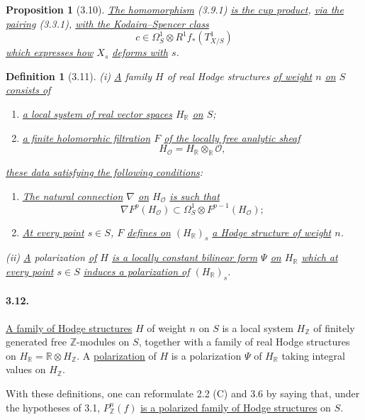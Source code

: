 \documentclass[10pt,leqno]{article}
\newcommand{\R}{\mathbb R}
\newcommand{\Z}{\mathbb Z}
\newcommand{\cO}{\mathcal O}
\theoremstyle{deligne}
\newtheorem*{definition}{Definition}
\newtheorem*{proposition}{Proposition}\newtheorem*{corollary}{Corollary}\newtheorem*{monodromyTheorem}{Monodromy Theorem}
\renewcommand{\underline}[1]{\uline{#1}}
\begin{document}
\begin{proposition}[3.10]\leavevmode\par\noindent
\underline{The homomorphism} (3.9.1) \underline{is the cup product}, \underline{via the pairing} (3.3.1), \underline{with the Kodaira--Spencer class}
\[
c\in\Omega_S^1\otimes R^1f_*(T^1_{X/S})
\]
\underline{which expresses how} $X_s$ \underline{deforms with} $s$.
\end{proposition}

\begin{definition}[3.11]
(i) \underline{A} family $H$ of real Hodge structures \underline{of weight} $n$ \underline{on} $S$ \underline{consists of}
\begin{enumerate}[label=\alph*)]
\item \underline{a local system of real vector spaces} $H_\R$ \underline{on} $S$;
\item \underline{a finite holomorphic filtration} $F$ \underline{of the locally free analytic sheaf}
\[
H_\cO=H_\R\otimes_\R\cO,
\]
\end{enumerate}
\underline{these data satisfying the following conditions}:
\begin{enumerate}[label=(H.\arabic*)]
\item \underline{The natural connection} $\nabla$ \underline{on} $H_\cO$ \underline{is such that}
\[
\nabla F^p(H_\cO)\subset \Omega_S^1\otimes F^{p-1}(H_\cO);
\]
\item \underline{At every point} $s\in S$, $F$ \underline{defines on} $(H_\R)_s$ \underline{a Hodge structure of weight} $n$.
\end{enumerate}
(ii) \underline{A} polarization \underline{of} $H$ \underline{is a locally constant bilinear form} $\Psi$ \underline{on} $H_\R$ \underline{which at every point} $s\in S$ \underline{induces a polarization of} $(H_\R)_s$.
\end{definition}

\paragraph{3.12.}
\underline{A family of Hodge structures} $H$ of weight $n$ on $S$ is a local system $H_\Z$ of finitely generated free $\Z$-modules on $S$, together with a family of real Hodge structures on $H_\R=\R\otimes H_\Z$. A \underline{polarization} of $H$ is a polarization $\Psi$ of $H_\R$ taking integral values on $H_\Z$.

With these definitions, one can reformulate 2.2 (C) and 3.6 by saying that, under the hypotheses of 3.1, $P_\Z^n(f)$ \underline{is a polarized family of Hodge structures} on $S$.
\end{document}
